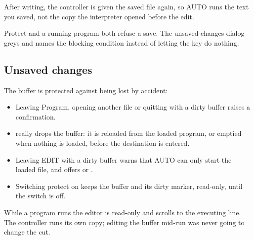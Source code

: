 After writing, the controller is given the saved file again, so AUTO runs the text you saved,
not the copy the interpreter opened before the edit.

\begin{cautionbox}
  Protect and a running program both refuse a save. The unsaved-changes dialog greys
   and names the blocking condition instead of letting the key do nothing.
\end{cautionbox}

\subsection*{Unsaved changes}

The buffer is protected against being lost by accident:

\begin{itemize}
  \item Leaving Program, opening another file or quitting with a dirty buffer raises a
        confirmation.
  \item {} really drops the buffer: it is reloaded from the loaded program, or
        emptied when nothing is loaded, before the destination is entered.
  \item Leaving EDIT with a dirty buffer warns that AUTO can only start the loaded file, and
        offers  or .
  \item Switching protect on keeps the buffer and its dirty marker, read-only, until the
        switch is off.
\end{itemize}

While a program runs the editor is read-only and scrolls to the executing line. The controller
runs its own copy; editing the buffer mid-run was never going to change the cut.
